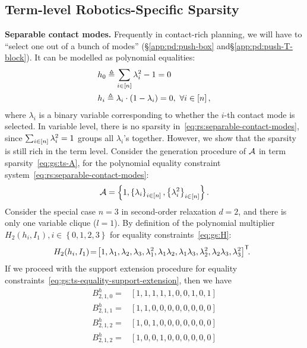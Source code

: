 \subsection{Term-level Robotics-Specific Sparsity}

% 

\textbf{Separable contact modes.} Frequently in contact-rich planning, we will have to ``select one out of a bunch of modes'' (\cf \S\ref{app:pd:push-box} and\S\ref{app:pd:push-T-block}). It can be modelled as polynomial equalities:
\begin{align}
    \label{eq:rs:separable-contact-modes}
    & h_0 \triangleq \sum_{i \in \left[ n \right]} \lambda_i^2 - 1 = 0 \\
    & h_i \triangleq \lambda_i \cdot (1 - \lambda_i) = 0, \ \forall i \in \left[ n \right],
\end{align}
where $\lambda_i$ is a binary variable corresponding to whether the $i$-th contact mode is selected.
In variable level, there is no sparsity in~\eqref{eq:rs:separable-contact-modes}, since $\sum_{i \in \left[ n \right]} \lambda_i^2 = 1$ groups all $\lambda_i$'s together. However, we show that the sparsity is still rich in the term level. Consider the generation procedure of ${\cal A}$ in term sparsity~\eqref{eq:gs:ts-A}, for the polynomial equality constraint system~\eqref{eq:rs:separable-contact-modes}:
\begin{align}
    \label{eq:rs:separable-contact-A}
    {\cal A} = \left\{ 
        1,
        \left\{ \lambda_i \right\}_{i \in \left[ n \right]}, 
        \left\{ \lambda_i^2 \right\}_{i \in \left[ n \right]}
     \right\}.
\end{align}
Consider the special case $n = 3$ in second-order relaxation $d = 2$, and there is only one variable clique (\ie $l = 1$). By definition of the polynomial multiplier $H_2(h_i, I_1), i \in \left\{ 0,1,2,3 \right\}$ for equality constraints~\eqref{eq:gs:H}:
\begin{align}
    \hspace{-4mm} H_2(h_i, I_1)\! =\! \left[ 
        1,\lam{1},\lam{2},\lam{3},\lam{1}^2,\lam{1}\lam{2},\lam{1}\lam{3},\lam{2}^2,\lam{2}\lam{3},\lam{3}^2
     \right]\tran\!\!.\!\!\!\! 
\end{align}
If we proceed with the support extension procedure for equality constraints~\eqref{eq:gs:ts-equality-support-extension}, then we have 
\begin{align}
    B_{2,1,0}^h = & \left[ 1,1,1,1,1,0,0,1,0,1 \right] \\
    B_{2,1,1}^h = & \left[ 1,1,0,0,0,0,0,0,0,0 \right] \\
    B_{2,1,2}^h = & \left[ 1,0,1,0,0,0,0,0,0,0 \right] \\
    B_{2,1,2}^h = & \left[ 1,0,0,1,0,0,0,0,0,0 \right]
\end{align}
